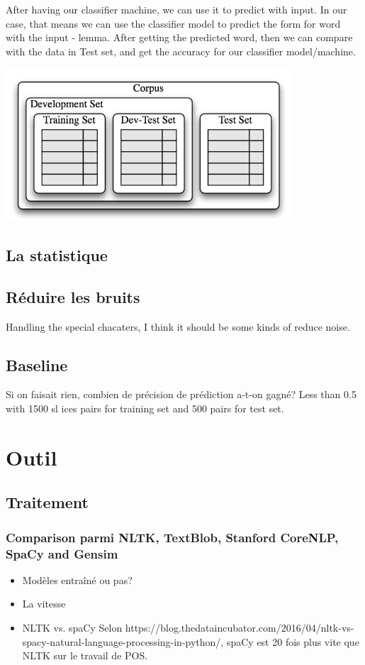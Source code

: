 \documentclass[a4paper]{article}
\begin{document}
After having our classifier machine, we can use it to predict with input. In our case, that means we can use the classifier model to predict the form for word with the input - lemma. After getting the predicted word, then we can compare with the data in Test set, and get the accuracy for our classifier model/machine.

\begin{center}
\includegraphics[width=0.8\textwidth]{Corpus.png}
\end{center}

\subsection{La statistique}

\subsection{Réduire les bruits}
Handling the special chacaters, I think it should be some kinds of reduce noise.
\subsection{Baseline}
Si on faisait rien, combien de précision de prédiction a-t-on gagné? 
Less than 0.5 with 1500 sl	ices pairs for training set and 500 pairs for test set.

\section{Outil}
\subsection{Traitement}
\subsubsection{Comparison parmi NLTK, TextBlob, Stanford CoreNLP, SpaCy and Gensim}
\begin{itemize}
\item Modèles entraîné ou pas?
\item La vitesse
\item NLTK vs. spaCy \cite{noauthor_nltk_2016} Selon https://blog.thedataincubator.com/2016/04/nltk-vs-spacy-natural-language-processing-in-python/, spaCy est 20 fois plus vite que NLTK sur le travail de POS.
\end{itemize}
\end{document}
